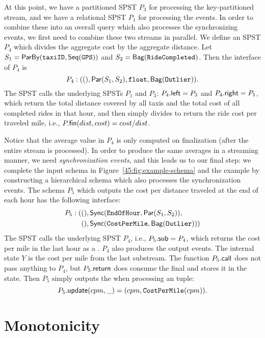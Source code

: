 At this point, we have a partitioned SPST $P_3$ for processing
the key-partitioned  stream,
and we have a relational SPST $P_1$ for processing the
 events.
In order to combine these into
an overall query
which also processes the 
synchronizing events,
we first need to combine these two streams in parallel.
We define an SPST $P_4$ which
divides the aggregate cost by the aggregate distance.
Let $S_1 = \mathsf{ParBy}({\texttt{taxiID}}, \mathsf{Seq}({ \texttt{GPS} }))$
and $S_2 = \mathsf{Bag}({ \texttt{RideCompleted} })$.
Then the interface of $P_4$ is
\[
P_4: ((), \mathsf{Par}({S_1}, {S_2}), \texttt{float}, \mathsf{Bag}({ \texttt{Outlier} })).
\]
The SPST calls the underlying SPSTs $P_1$ and $P_3$: ${P_4}.{\mathsf{left}} = P_3$ and ${P_4}.{\mathsf{right}} = P_1$, which return the total distance covered by all taxis and the total cost of all completed rides in that hour,
and then simply divides to return the  ride cost per traveled mile, i.e., ${P}.{\mathsf{fin}}(dist, cost) = cost / dist$.

Notice that the average value in $P_4$
is only computed on finalization (after the entire stream is processed).
In order to produce the same averages in a streaming manner,
we need \emph{synchronization events},
and this leads us to our final step:
we complete the input schema in Figure~\ref{45:fig:example-schema}
and the example by constructing a hierarchical schema
which also processes
the  synchronization events.
The schema $P_5$ which outputs the cost per distance traveled
at the end of each hour
has the following interface:
\begin{align*}
P_5: (
    &(), \mathsf{Sync}({ \texttt{EndOfHour} },  \mathsf{Par}({S_1}, {S_2}) ), \\
    &(), \mathsf{Sync}({ \texttt{CostPerMile} },  \mathsf{Bag}({\texttt{Outlier}}) )
)
\end{align*}
The SPST calls the underlying SPST $P_4$, i.e., ${P_5}.{\mathsf{sub}} = P_4$,  which returns the cost per mile in the last hour as a .
$P_4$ also produces the  output events.
The internal state $Y$ is the cost per mile
from the last substream.
The function ${P_5}.{\mathsf{call}}$
does not pass anything to $P_4$,
but ${P_5}.{\mathsf{return}}$ does consume the final 
and stores it in the state.
Then $P_5$ simply outputs the  when processing an  tuple:
\[
{P_5}.{\mathsf{update}}(cpm, \_) = (cpm, \texttt{CostPerMile}(cpm)).
\]

\section{Monotonicity}
\label{45:sec:theorems}

